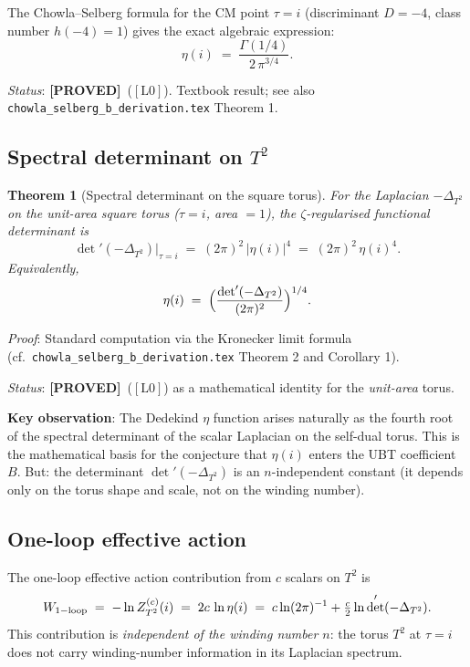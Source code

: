 \documentclass[12pt,a4paper]{article}
\newtheorem{theorem}{Theorem}[section]
\theoremstyle{definition}
\theoremstyle{remark}
\newcommand{\PROVED}{\textcolor{green!60!black}{\textbf{[PROVED]}}}
\newcommand{\Lzero}{$[\mathrm{L0}]$}
\begin{document}
The Chowla--Selberg formula for the CM point $\tau = i$ (discriminant
$D = -4$, class number $h(-4) = 1$) gives the exact algebraic expression:
\begin{equation}\label{eq:eta_i}
  \eta(i) \;=\; \frac{\Gamma(1/4)}{2\,\pi^{3/4}}.
\end{equation}

\noindent\textit{Status}: \PROVED\ (\Lzero).  Textbook result; see also
\texttt{chowla\_selberg\_b\_derivation.tex} Theorem 1.

\subsection{Spectral determinant on $T^2$}

\begin{theorem}[Spectral determinant on the square torus]
For the Laplacian $-\Delta_{T^2}$ on the unit-area square torus
($\tau = i$, area $= 1$), the $\zeta$-regularised functional determinant is
\begin{equation}\label{eq:det_torus}
  \det'(-\Delta_{T^2})\big|_{\tau=i}
  \;=\; (2\pi)^2\,|\eta(i)|^4
  \;=\; (2\pi)^2\,\eta(i)^4.
\end{equation}
Equivalently,
\[
  \eta(i) \;=\;
  \Bigl(\frac{\det'(-\Delta_{T^2})}{(2\pi)^2}\Bigr)^{1/4}.
\]
\end{theorem}

\noindent\textit{Proof}: Standard computation via the Kronecker limit formula
(cf.\ \texttt{chowla\_selberg\_b\_derivation.tex} Theorem 2 and Corollary 1).

\noindent\textit{Status}: \PROVED\ (\Lzero) as a mathematical identity for
the \emph{unit-area} torus.

\begin{insightbox}
\textbf{Key observation}: The Dedekind $\eta$ function arises naturally as
the fourth root of the spectral determinant of the scalar Laplacian on the
self-dual torus.  This is the mathematical basis for the conjecture that
$\eta(i)$ enters the UBT coefficient $B$.  But: the determinant
$\det'(-\Delta_{T^2})$ is an $n$-independent constant (it depends only on
the torus shape and scale, not on the winding number).
\end{insightbox}

\subsection{One-loop effective action}

The one-loop effective action contribution from $c$ scalars on $T^2$ is
\begin{equation}\label{eq:Woneloop}
  W_{\rm 1-loop}
  \;=\; -\ln Z^{(c)}_{T^2}(i)
  \;=\; 2c\,\ln\eta(i)
  \;=\; c\ln(2\pi)^{-1} + \tfrac{c}{2}\ln\det'(-\Delta_{T^2}).
\end{equation}
This contribution is \emph{independent of the winding number $n$}:
the torus $T^2$ at $\tau = i$ does not carry winding-number information in
its Laplacian spectrum.
\end{document}
